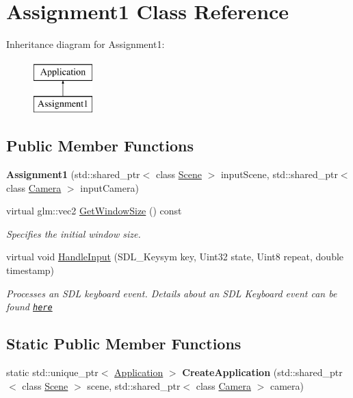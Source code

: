 \hypertarget{class_assignment1}{}\section{Assignment1 Class Reference}
\label{class_assignment1}
Inheritance diagram for Assignment1\+:\begin{figure}[H]
\begin{center}
\leavevmode
\includegraphics[height=2.000000cm]{class_assignment1}
\end{center}
\end{figure}
\subsection*{Public Member Functions}
\begin{DoxyCompactItemize}
\item 
\hypertarget{class_assignment1_ade9ef18c233dab37d37f20760fe7674d}{}{\bfseries Assignment1} (std\+::shared\+\_\+ptr$<$ class \hyperlink{class_scene}{Scene} $>$ input\+Scene, std\+::shared\+\_\+ptr$<$ class \hyperlink{class_camera}{Camera} $>$ input\+Camera)\label{class_assignment1_ade9ef18c233dab37d37f20760fe7674d}

\item 
virtual glm\+::vec2 \hyperlink{class_assignment1_a27daa24c1afe9e10bd6615dfa250473e}{Get\+Window\+Size} () const 
\begin{DoxyCompactList}\small\item\em Specifies the initial window size. \end{DoxyCompactList}\item 
virtual void \hyperlink{class_assignment1_a29da6ab20003bfec87bcc93474dc8ade}{Handle\+Input} (S\+D\+L\+\_\+\+Keysym key, Uint32 state, Uint8 repeat, double timestamp)
\begin{DoxyCompactList}\small\item\em Processes an S\+D\+L keyboard event. Details about an S\+D\+L Keyboard event can be found \href{https://wiki.libsdl.org/SDL_KeyboardEvent}{\tt here} \end{DoxyCompactList}\end{DoxyCompactItemize}
\subsection*{Static Public Member Functions}
\begin{DoxyCompactItemize}
\item 
\hypertarget{class_assignment1_ae1952b4904620a16c4f2c098bf061c68}{}static std\+::unique\+\_\+ptr$<$ \hyperlink{class_application}{Application} $>$ {\bfseries Create\+Application} (std\+::shared\+\_\+ptr$<$ class \hyperlink{class_scene}{Scene} $>$ scene, std\+::shared\+\_\+ptr$<$ class \hyperlink{class_camera}{Camera} $>$ camera)\label{class_assignment1_ae1952b4904620a16c4f2c098bf061c68}

\end{DoxyCompactItemize}
